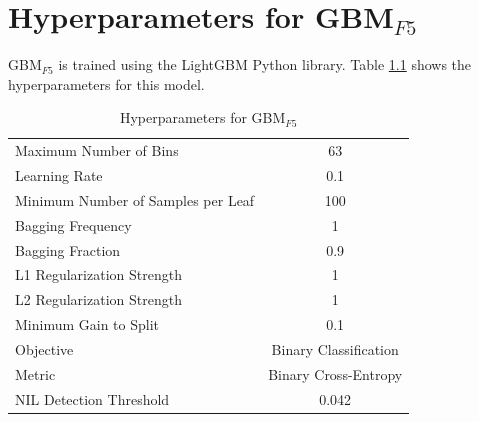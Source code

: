 \documentclass{report}
\theoremstyle{definition}
\theoremstyle{remark}
\begin{document}





\appendix
\chapter{Hyperparameters for GBM$_{F5}$}
\label{app:lgbm}

GBM$_{F5}$ is trained using the LightGBM \cite{lightgbmlib} Python library. Table \ref{tab:lgbmhyper} shows the hyperparameters for this model.

\begin{table}[H]
    \centering
    \begin{tabular}{|lc|}
    \hline
     Maximum Number of Bins & 63  \\
     Learning Rate & 0.1\\
     Minimum Number of Samples per Leaf & 100 \\
     Bagging Frequency & 1 \\
     Bagging Fraction & 0.9 \\
     L1 Regularization Strength & 1 \\
     L2 Regularization Strength & 1 \\
     Minimum Gain to Split & 0.1 \\
     Objective & Binary Classification \\
     Metric & Binary Cross-Entropy \\
     NIL Detection Threshold & 0.042\\
     \hline
    \end{tabular}
    \caption{Hyperparameters for GBM$_{F5}$}
    \label{tab:lgbmhyper}
\end{table}
\end{document}
